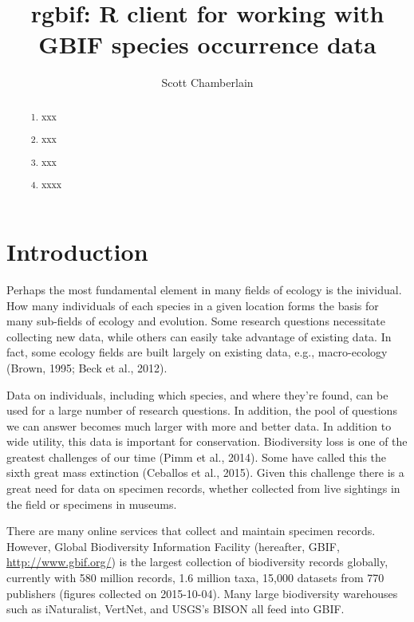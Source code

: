 \documentclass[author-year, review, 11pt]{components/elsarticle} %
\begin{document}
\begin{frontmatter}

  \title{rgbif: R client for working with GBIF species occurrence data}
    \author[cstar]{Scott Chamberlain}
      \address[cstar]{University of California, Berkeley, CA, USA}    
  
  \begin{abstract}
  \begin{enumerate}
  \def\labelenumi{\arabic{enumi}.}
  \item
    xxx
  \item
    xxx
  \item
    xxx
  \item
    xxxx
  \end{enumerate}
  \end{abstract}
  
 \end{frontmatter}


\section{Introduction}\label{introduction}

Perhaps the most fundamental element in many fields of ecology is the
inividual. How many individuals of each species in a given location
forms the basis for many sub-fields of ecology and evolution. Some
research questions necessitate collecting new data, while others can
easily take advantage of existing data. In fact, some ecology fields are
built largely on existing data, e.g., macro-ecology (Brown, 1995; Beck
et al., 2012).

Data on individuals, including which species, and where they're found,
can be used for a large number of research questions. In addition, the
pool of questions we can answer becomes much larger with more and better
data. In addition to wide utility, this data is important for
conservation. Biodiversity loss is one of the greatest challenges of our
time (Pimm et al., 2014). Some have called this the sixth great mass
extinction (Ceballos et al., 2015). Given this challenge there is a
great need for data on specimen records, whether collected from live
sightings in the field or specimens in museums.

There are many online services that collect and maintain specimen
records. However, Global Biodiversity Information Facility (hereafter,
GBIF, \url{http://www.gbif.org/}) is the largest collection of
biodiversity records globally, currently with 580 million records, 1.6
million taxa, 15,000 datasets from 770 publishers (figures collected on
2015-10-04). Many large biodiversity warehouses such as iNaturalist,
VertNet, and USGS's BISON all feed into GBIF.
\end{document}
